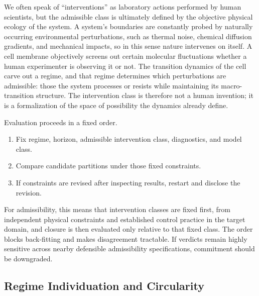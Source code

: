 We often speak of ``interventions'' as laboratory actions performed by
human scientists, but the admissible class is ultimately defined by the
objective physical ecology of the system. A system's boundaries are
constantly probed by naturally occurring environmental perturbations,
such as thermal noise, chemical diffusion gradients, and mechanical
impacts, so in this sense nature intervenes on itself. A
cell membrane objectively screens out certain molecular fluctuations
whether a human experimenter is observing it or not. The transition
dynamics of the cell carve out a regime, and that regime determines
which perturbations are admissible: those the system processes or
resists while maintaining its macro-transition structure. The
intervention class is therefore not a human invention; it is a formalization of the space of
possibility the dynamics already define.

Evaluation proceeds in a fixed order.

\begin{enumerate}
	\item
	      Fix regime, horizon, admissible intervention class, diagnostics, and
	      model class.
	\item
	      Compare candidate partitions under those fixed constraints.
	\item
	      If constraints are revised after inspecting results, restart and
	      disclose the revision.
\end{enumerate}

For admissibility, this means that intervention classes are fixed first,
from independent physical constraints and established control practice
in the target domain, and closure is then evaluated only relative to
that fixed class. The order blocks back-fitting and makes disagreement
tractable. If verdicts remain highly sensitive across nearby defensible
admissibility specifications, commitment should be downgraded.

\subsection{Regime Individuation and
	Circularity}\label{regime-individuation-and-circularity}

